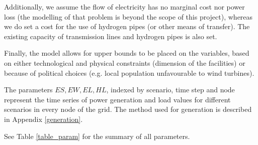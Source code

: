 Additionally, we assume the flow of electricity has no marginal cost nor power loss (the modelling of that problem is beyond the scope of this project), whereas we do set a cost for the use of hydrogen pipes (or other means of transfer). 
The existing capacity of transmission lines and hydrogen pipes is also set.

Finally, the model allows for upper bounds to be placed on the variables, based on either technological and physical constraints (dimension of the facilities) or because of political choices (e.g. local population unfavourable to wind turbines).

The parameters $ES, EW, EL, HL$, indexed by scenario, time step and node represent the time series of power generation and load values for different scenarios in every node of the grid. 
The method used for generation is described in Appendix \ref{generation}.

See Table \ref{table_param} for the summary of all parameters. 

